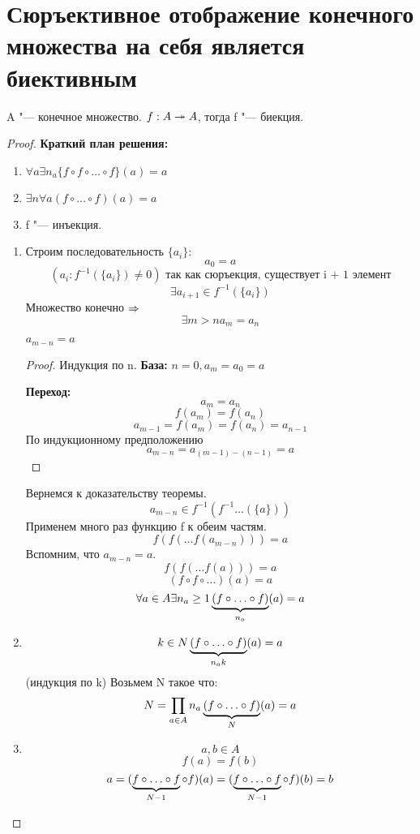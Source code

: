 ﻿\section{Сюръективное отображение конечного множества на себя является биективным}

\begin{theorem}{}
    A "--- конечное множество. 
    $f: A \twoheadrightarrow A$, тогда f "--- биекция.
\end{theorem}

\begin{proof}
    {\bf Краткий план решения:}
    \begin{enumerate}
        \item $\forall a \exists n_a \{f \circ f \circ \ldots \circ f\}(a) = a$
        \item $\exists n \forall a (f \circ \ldots \circ f)(a)  = a$
        \item f "--- инъекция.
    \end{enumerate}
    \begin{enumerate}
    \item
    Строим последовательность $\{a_i\}$:
    $$a_0 = a$$
    $$(a_i: f^{-1}(\{a_i\}) \ne 0)\text{ так как сюръекция, существует i + 1 элемент}$$ 
    $$\exists a_{i + 1} \in f^{-1}(\{a_i\})$$ 
    Множество конечно $\Rightarrow$
    $$\exists m > n a_m = a_n$$
    \begin{lemma}{}
        $a_{m - n} = a$   
    \end{lemma}
    \begin{proof}
        Индукция по n.
        {\bf База:} $n = 0,  a_m = a_0 = a$
       
        {\bf Переход:} $$a_m = a_n$$
        $$f(a_m) = f(a_n)$$
        $$a_{m - 1} = f(a_m) = f(a_n) = a_{n - 1}$$
        По индукционному предположению 
        $$a_{m - n} = a_{(m - 1) - (n - 1)} = a$$
    \end{proof}
    
    Вернемся к доказательству теоремы.
    $$a_{m - n} \in  f^{-1}(f^{-1}\ldots(\{a\}))$$
    Применем много раз функцию f к обеим частям.
    $$f(f(\ldots f(a_{m - n}))) = a$$
    Вспомним, что $a_{m - n} = a$.
    $$f(f(\ldots f(a))) = a$$
    $$(f \circ f \circ \ldots)(a) = a$$
    $$\forall a \in A \exists n_a \ge 1 \underbrace{(f \circ \ldots \circ f)}_{n_a}(a) = a$$
    \item 
    $$k \in N \underbrace{(f \circ \ldots \circ f)}_{n_a k}(a) = a$$
    (индукция по k)
    Возьмем N такое что:
    $$N = \prod_{a \in A} n_a  \underbrace{(f \circ \ldots \circ f)}_{N}(a) = a$$
    \item
    $$a, b \in A$$
    $$f(a) = f(b)$$
    $$a = (\underbrace{f \circ \ldots \circ f}_{N - 1} \circ f)(a) = (\underbrace{f \circ \ldots \circ f}_{N - 1} \circ f)(b) = b$$
    \end{enumerate}
\end{proof}
